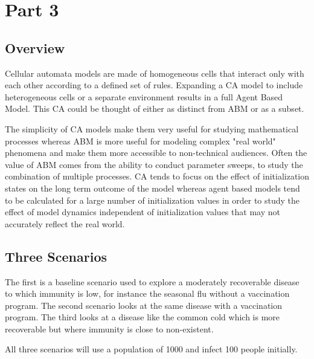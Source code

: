 \documentclass[11pt]{article} %
\begin{document}


\pagebreak

\section{Part 3}

\subsection{Overview}

Cellular automata models are made of homogeneous cells that interact only with each other according to a defined set of rules. Expanding a CA model to include heterogeneous cells or a separate environment results in a full Agent Based Model. This CA could be thought of either as distinct from ABM or as a subset. 
 
The simplicity of CA models make them very useful for studying mathematical processes whereas ABM is more useful for modeling complex "real world" phenomena and make them more accessible to non-technical audiences. Often the value of ABM comes from the ability to conduct parameter sweeps, to study the combination of multiple processes. CA tends to focus on the effect of initialization states on the long term outcome of the model whereas agent based models tend to be calculated for a large number of initialization values in order to study the effect of model dynamics independent of initialization values that may not accurately reflect the real world. 

\subsection{Three Scenarios}

The first is a baseline scenario used to explore a moderately recoverable disease to which immunity is low, for instance the seasonal flu without a vaccination program. The second scenario looks at the same disease with a vaccination program. The third looks at a disease like the common cold which is more recoverable but where immunity is close to non-existent. 

All three scenarios will use a population of 1000 and infect 100 people initially. 
\end{document}
